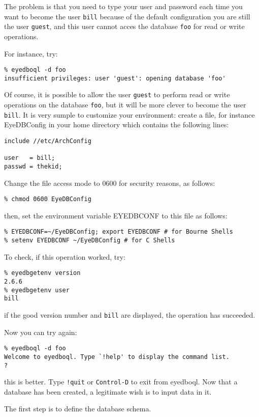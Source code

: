 The problem is that you need to type your user and password each time you
want to become the user \texttt{bill} because of the default configuration
you are still the user \texttt{guest}, and this user cannot acces the
database \texttt{foo} for read or write operations.

For instance, try:
\verbsize \begin{verbatim}
% eyedboql -d foo
insufficient privileges: user 'guest': opening database 'foo'
\end{verbatim}
\normalsize
Of course, it is possible to allow the user \texttt{guest} to perform
read or write operations on the database \texttt{foo}, but it will be
more clever to become the user \texttt{bill}.
It is very sumple to customize your environment:
create a file, for instance EyeDBConfig in your home
directory which contains the following lines:
\verbsize \begin{verbatim}
include //etc/ArchConfig
 
user   = bill;
passwd = thekid;
\end{verbatim}
\normalsize
Change the file access mode to 0600 for security reasons, as follows:
\verbsize \begin{verbatim}
% chmod 0600 EyeDBConfig
\end{verbatim}
\normalsize
then, set the environment variable EYEDBCONF to this file as follows:
\verbsize \begin{verbatim}
% EYEDBCONF=~/EyeDBConfig; export EYEDBCONF # for Bourne Shells
\end{verbatim}
\normalsize
To check, if this operation worked, try:
\verbsize \begin{verbatim}
% eyedbgetenv version
2.6.6
bill
\end{verbatim}
\normalsize
if the good version number \texttt{\eyedbversion} and \texttt{bill} are displayed,
the operation has succeeded.

Now you can try again:
\verbsize \begin{verbatim}
% eyedboql -d foo
Welcome to eyedboql. Type `!help' to display the command list.
? 
\end{verbatim}
\normalsize
this is better. Type \texttt{!quit} or \texttt{Control-D} to exit from
eyedboql.
Now that a database has been created, a legitimate wish is to input data
in it.

The first step is to define the database schema.

